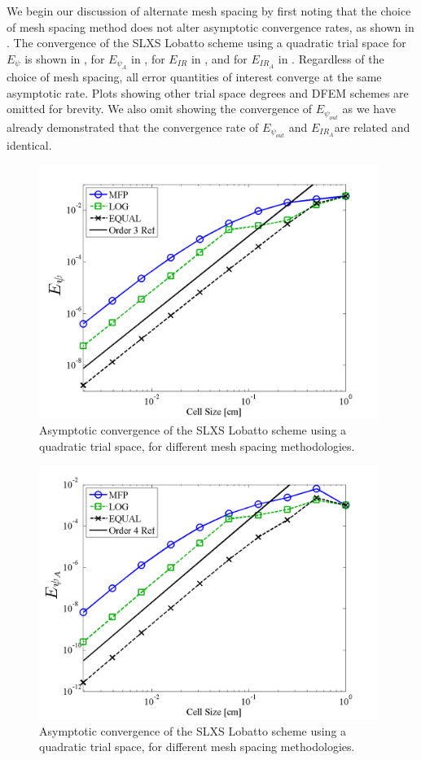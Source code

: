 We begin our discussion of alternate mesh spacing by first noting that the choice of mesh spacing method does not alter asymptotic convergence rates, as shown in
.  
The convergence of the SLXS Lobatto scheme using a quadratic trial space for 
$E_{\psi}$ is shown in , 
for $E_{\psi_A}$ in , for $E_{IR}$ in , and for $E_{IR_A}$ 
in .
Regardless of the choice of mesh spacing, all error quantities of interest converge at the same asymptotic rate. 
Plots showing other trial space degrees and DFEM schemes are omitted for brevity.  
We also omit showing the convergence of $E_{\psi_{out}}$ as we have already demonstrated that the convergence rate of $E_{\psi_{out}}$ and $E_{IR_A}$are related and identical.
\begin{figure}[!htp]
\centering
\includegraphics[width=11cm]{chapter3_variable_xs/P2_LOBATTO_E_PSI.png}
\caption{Asymptotic convergence of the SLXS Lobatto scheme using a quadratic trial space, for different mesh spacing methodologies.}
\label{fig:lobatto_spacing_psi}
\end{figure}
%
%
\begin{figure}[!hbp]
\centering
\includegraphics[width=11cm]{chapter3_variable_xs/P2_LOBATTO_E_PSI_A.png}
\caption{Asymptotic convergence of the SLXS Lobatto scheme using a quadratic trial space, for different mesh spacing methodologies.}
\label{fig:lobatto_spacing_psi_A}
\end{figure}
